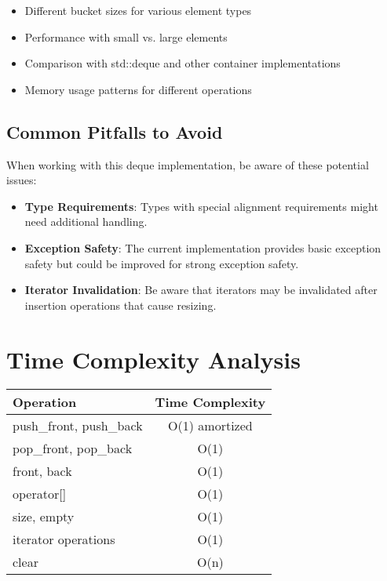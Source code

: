 \documentclass[a4paper,12pt]{article}
\begin{document}
\begin{itemize}
    \item Different bucket sizes for various element types
    \item Performance with small vs. large elements
    \item Comparison with std::deque and other container implementations
    \item Memory usage patterns for different operations
\end{itemize}

\subsection{Common Pitfalls to Avoid}
When working with this deque implementation, be aware of these potential issues:

\begin{itemize}
    \item \textbf{Type Requirements}: Types with special alignment requirements might need additional handling.
    \item \textbf{Exception Safety}: The current implementation provides basic exception safety but could be improved for strong exception safety.
    \item \textbf{Iterator Invalidation}: Be aware that iterators may be invalidated after insertion operations that cause resizing.
\end{itemize}

\section{Time Complexity Analysis}

\begin{center}
\begin{tabular}{|l|c|}
\hline
\textbf{Operation} & \textbf{Time Complexity} \\
\hline
push\_front, push\_back & O(1) amortized \\
pop\_front, pop\_back & O(1) \\
front, back & O(1) \\
operator[] & O(1) \\
size, empty & O(1) \\
iterator operations & O(1) \\
clear & O(n) \\
\hline
\end{tabular}
\end{center}
\end{document}
